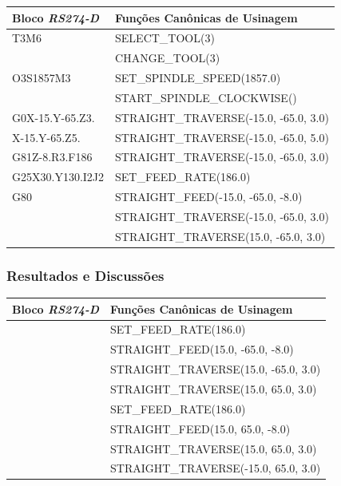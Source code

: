 \documentclass[aspectratio=169]{beamer}
\begin{document}
{\begin{frame}[fragile]
\begin{tabular}{ |l|l| }
    \hline
    \scriptsize{\bfseries{Bloco \emph{RS274-D}}} & 
    \scriptsize{\bfseries{Funções Canônicas de Usinagem}} \\
    \hline

    \scriptsize{T3M6} & \scriptsize{SELECT\_TOOL(3)} \\
    & \scriptsize{CHANGE\_TOOL(3)} \\ 
    \hline
    \scriptsize{O3S1857M3} & \scriptsize{SET\_SPINDLE\_SPEED(1857.0)} \\
    & \scriptsize{START\_SPINDLE\_CLOCKWISE()} \\
    \hline
    \scriptsize{G0X-15.Y-65.Z3.} & \scriptsize{STRAIGHT\_TRAVERSE(-15.0, -65.0, 3.0)} \\
    \hline
    \scriptsize{X-15.Y-65.Z5.} & \scriptsize{STRAIGHT\_TRAVERSE(-15.0, -65.0, 5.0)} \\
    \hline
    \scriptsize{G81Z-8.R3.F186} & \scriptsize{STRAIGHT\_TRAVERSE(-15.0, -65.0, 3.0)} \\
    \scriptsize{G25X30.Y130.I2J2} & \scriptsize{SET\_FEED\_RATE(186.0)} \\
    \scriptsize{G80} & \scriptsize{STRAIGHT\_FEED(-15.0, -65.0, -8.0)} \\
    & \scriptsize{STRAIGHT\_TRAVERSE(-15.0, -65.0, 3.0)} \\
    & \scriptsize{STRAIGHT\_TRAVERSE(15.0, -65.0, 3.0)} \\
    \hline

\end{tabular}  

\end{frame}


\begin{frame}[fragile]
  \frametitle{Resultados e Discussões}

  \begin{tabular}{ |l|l| }

    \hline
    \scriptsize{\bfseries{Bloco \emph{RS274-D}}} & 
    \scriptsize{\bfseries{Funções Canônicas de Usinagem}} \\
    \hline

    & \scriptsize{SET\_FEED\_RATE(186.0)} \\
    & \scriptsize{STRAIGHT\_FEED(15.0, -65.0, -8.0)} \\
    & \scriptsize{STRAIGHT\_TRAVERSE(15.0, -65.0, 3.0)} \\
    & \scriptsize{STRAIGHT\_TRAVERSE(15.0, 65.0, 3.0)} \\
    & \scriptsize{SET\_FEED\_RATE(186.0)} \\
    & \scriptsize{STRAIGHT\_FEED(15.0, 65.0, -8.0)} \\
    & \scriptsize{STRAIGHT\_TRAVERSE(15.0, 65.0, 3.0)} \\
    & \scriptsize{STRAIGHT\_TRAVERSE(-15.0, 65.0, 3.0)} \\


\end{tabular}
\end{frame}}
\end{document}
